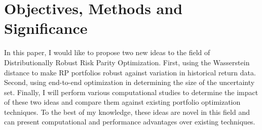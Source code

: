 \documentclass[12pt]{article}
\begin{document}
\section{Objectives, Methods and Significance}
In this paper, I would like to propose two new ideas to the field of Distributionally Robust Risk Parity Optimization.  First, using the Wasserstein distance to make RP portfolios robust against variation in historical return data. Second, using end-to-end optimization in determining the size of the uncertainty set. Finally, I will perform various computational studies to determine the impact of these two ideas and compare them against existing portfolio optimization techniques. To the best of my knowledge, these ideas are novel in this field and can present computational and performance advantages over existing techniques.

\newpage

  


\end{document}
